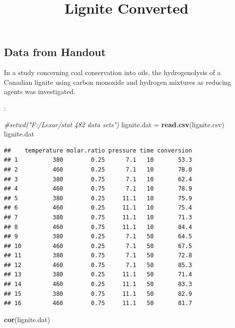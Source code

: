\documentclass[
]{article}
\title{Lignite Converted}
\author{}
\date{\vspace{-2.5em}}
\newenvironment{Shaded}{\begin{snugshade}}{\end{snugshade}}
\newcommand{\CommentTok}[1]{\textcolor[rgb]{0.56,0.35,0.01}{\textit{#1}}}
\newcommand{\FunctionTok}[1]{\textcolor[rgb]{0.13,0.29,0.53}{\textbf{#1}}}
\newcommand{\NormalTok}[1]{#1}
\newcommand{\OtherTok}[1]{\textcolor[rgb]{0.56,0.35,0.01}{#1}}
\newcommand{\StringTok}[1]{\textcolor[rgb]{0.31,0.60,0.02}{#1}}
\begin{document}
\maketitle

\hypertarget{data-from-handout}{%
\subsection{Data from Handout}\label{data-from-handout}}

In a study concerning coal conservation into oils, the hydrogenolysis of
a Canadian lignite using carbon monoxide and hydrogen mixtures as
reducing agents was investigated.

:

\begin{Shaded}
\begin{Highlighting}[]
\CommentTok{\#setwd("F:/Lexar/stat 482 data sets")}
\NormalTok{lignite.dat }\OtherTok{=} \FunctionTok{read.csv}\NormalTok{(}\StringTok{\textquotesingle{}lignite.csv\textquotesingle{}}\NormalTok{)}
\NormalTok{lignite.dat}
\end{Highlighting}
\end{Shaded}

\begin{verbatim}
##    temperature molar.ratio pressure time conversion
## 1          380        0.25      7.1   10       53.3
## 2          460        0.25      7.1   10       78.0
## 3          380        0.75      7.1   10       62.4
## 4          460        0.75      7.1   10       78.9
## 5          380        0.25     11.1   10       75.9
## 6          460        0.25     11.1   10       75.4
## 7          380        0.75     11.1   10       71.3
## 8          460        0.75     11.1   10       84.4
## 9          380        0.25      7.1   50       64.5
## 10         460        0.25      7.1   50       67.5
## 11         380        0.75      7.1   50       72.8
## 12         460        0.75      7.1   50       85.3
## 13         380        0.25     11.1   50       71.4
## 14         460        0.25     11.1   50       83.3
## 15         380        0.75     11.1   50       82.9
## 16         460        0.75     11.1   50       81.7
\end{verbatim}

\begin{Shaded}
\begin{Highlighting}[]
\FunctionTok{cor}\NormalTok{(lignite.dat)}
\end{Highlighting}
\end{Shaded}
\end{document}
